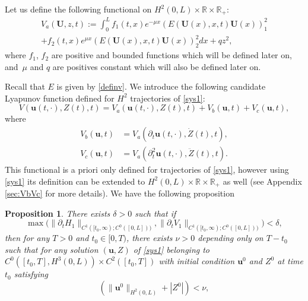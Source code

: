 \documentclass[JEP,XML,SOM,Unicode]{cedram}
\newtheorem{prop}[thm]{Proposition}
\theoremstyle{definition}
\begin{document}
Let {us} define the following functional on $H^{2}(0,L)\times\mathbb{R}\times\mathbb{R}_{+}$:
\begin{multline}
\label{Va}
V_{a}(\boldsymbol{U},z,t):=\int_{0}^{L}f_{1}(t,x)e^{-\mu x}(E(\boldsymbol{U}(x),x,t)\boldsymbol{U}{(x)})_{1}^{2}\\
+f_{2}(t,x)e^{\mu x}(E(\boldsymbol{U}(x),x,t)\boldsymbol{U}{(x)})_{2}^{2}dx+qz^{2},
\end{multline}
where $f_{1}$, $f_{2}$ are positive and bounded functions which will be defined later on, and~$\mu$ and $q$ are positives constant which will also be defined later on. {Recall that $E$ is given by \eqref{definv}. We introduce the following candidate Lyapunov function defined for $H^{2}$ trajectories of \eqref{sys1}:
\begin{equation}
\label{def-V-tot}
V(\boldsymbol{u}(t,\cdot),Z(t),t) = V_{a}(\boldsymbol{u}(t,\cdot),Z(t),t)+V_{b}(\boldsymbol{u},t)+V_{c}(\boldsymbol{u},t),
\end{equation}
where
\begin{equation}
\begin{split}
V_{b}(\boldsymbol{u},t) &= V_{a}(\partial_{t}\boldsymbol{u}(t,\cdot),\dot Z(t),t),\\
V_{c}(\boldsymbol{u},t) &= V_{a}(\partial_{t}^{2}\boldsymbol{u}(t,\cdot),\ddot Z(t),t).
\end{split}
\label{VbVc2}
\end{equation}
This functional is a priori only defined for trajectories of \eqref{sys1}, however using \eqref{sys1} its definition can be extended to $H^{2}(0,L)\times\mathbb{R}\times\mathbb{R}_{+}$ as well (see Appendix \ref{sec:VbVc} for more details). We have the following proposition
\begin{prop}
\label{propf1f2}
There exists $\delta>0$ such that if
\begin{equation*}
\max\bigl(\lVert\partial_{t}H_{1}\rVert_{C^{1}([t_{0},\infty);{C^{0}([0,L])})},\lVert\partial_{t}V_{1}\rVert_{C^{1}([t_{0},\infty);{C^{0}([0,L])})}\bigr)<\delta,
\end{equation*}
then for any $T>0$ and $t_{0}\in[0,T)$,
there exists $\nu>0$ {depending only on $T-t_{0}$}
such that for any solution $(\boldsymbol{u},Z)$ of \eqref{sys1} belonging to $C^{0}([t_{0},T],H^{3}(0,L))\times C^{2}([t_{0},T])$ with initial condition $\boldsymbol{u}^{0}$ and $Z^{0}$ at time $t_{0}$ satisfying
\begin{equation*}
\left(\lVert \boldsymbol{u}^{0}\rVert_{H^{2}(0,L)}+|Z^{0}|\right)<\nu,
\end{equation*}

\end{prop}}
\end{document}
